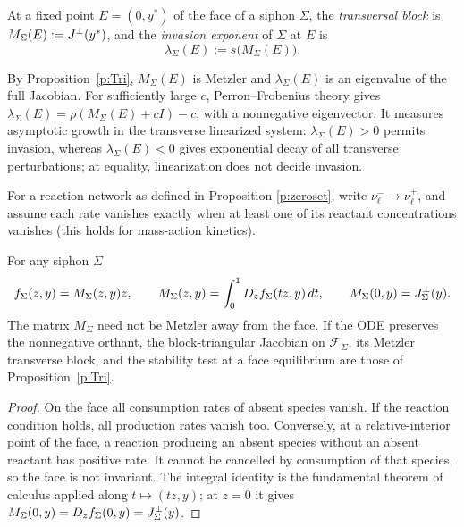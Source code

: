 At a fixed point $E=(0,y^*)$ of the face of a siphon $\Sigma$, the
\emph{transversal block} is $M_\Sigma(E):=J^\perp(y^*)$, and the \emph{invasion
exponent} of $\Sigma$ at $E$ is
\[
\lambda_\Sigma(E):=s\bigl(M_\Sigma(E)\bigr).
\]
\eeD

By Proposition~\ref{p:Tri}, $M_\Sigma(E)$ is Metzler and
$\lambda_\Sigma(E)$ is an eigenvalue of the full Jacobian. For sufficiently
large $c$, Perron--Frobenius theory gives
$\lambda_\Sigma(E)=\rho(M_\Sigma(E)+cI)-c$, with a nonnegative eigenvector.
It measures asymptotic growth in the transverse linearized system:
$\lambda_\Sigma(E)>0$ permits invasion, whereas
$\lambda_\Sigma(E)<0$ gives exponential decay of all transverse perturbations;
at equality, linearization does not decide invasion.

\label{t:Inv}
For a reaction network  as defined in Proposition \ref{p:zeroset}, write $\nu^-_\ell\to\nu^+_\ell$, and   assume
each rate vanishes exactly when at least one of its reactant
concentrations vanishes (this  holds for mass-action
kinetics).

For any siphon $\Sigma$
\[
 f_\Sigma(z,y)=M_\Sigma(z,y)z,\qquad
 M_\Sigma(z,y)=\int_0^1D_zf_\Sigma(tz,y)\,dt,
 \qquad M_\Sigma(0,y)=J_{\Sigma}^\perp(y).
\]
The matrix $M_\Sigma$ need not be Metzler away from the face. If the ODE
preserves the nonnegative orthant, the block-triangular Jacobian on
$\mathcal F_\Sigma$, its Metzler transverse block, and the stability test at a face
equilibrium are those of Proposition~\ref{p:Tri}.
\eeP
\begin{proof}
On the face all consumption rates of absent species vanish. If the
reaction condition holds, all production rates vanish too. Conversely,
at a relative-interior point of the face, a reaction producing an
absent species without an absent reactant has positive rate. It cannot
be cancelled by consumption of that species, so the face is not
invariant. The integral identity is the fundamental theorem of
calculus applied along $t\mapsto(tz,y)$; at $z=0$ it gives
$M_\Sigma(0,y)=D_zf_\Sigma(0,y)=J_{\Sigma}^\perp(y)$.
\end{proof}

